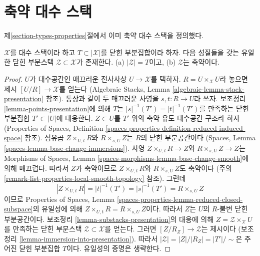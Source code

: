 \section{축약 대수 스택}
\label{section-reduced}

\noindent
제\ref{section-types-properties}절에서 이미 축약 대수 스택을 정의했다.

\begin{lemma}
\label{lemma-reduced-closed-substack}
$\mathcal{X}$를 대수 스택이라 하고 $T \subset |\mathcal{X}|$를 닫힌 부분집합이라 하자.
다음 성질들을 갖는 유일한 닫힌 부분스택
$\mathcal{Z} \subset \mathcal{X}$가 존재한다.
(a) $|\mathcal{Z}| = T$이고, (b) $\mathcal{Z}$는 축약이다.
\end{lemma}

\begin{proof}
$U$가 대수공간인 매끄러운 전사사상 $U \to \mathcal{X}$를 택하자.
$R = U \times_\mathcal{X} U$라 놓으면 제시 $[U/R] \to \mathcal{X}$를 얻는다
(Algebraic Stacks, Lemma \ref{algebraic-lemma-stack-presentation} 참조).
통상과 같이 두 매끄러운 사영을 $s, t : R \to U$라 쓰자.
보조정리 \ref{lemma-points-presentation}에 의해 $T$는
$|s|^{-1}(T') = |t|^{-1}(T')$를 만족하는 닫힌 부분집합
$T' \subset |U|$에 대응한다. $Z \subset U$를 $T'$ 위의 축약 유도
대수공간 구조라 하자(Properties of Spaces,
Definition \ref{spaces-properties-definition-reduced-induced-space} 참조).
섬유곱 $Z \times_{U, t} R$와 $R \times_{s, U} Z$는 $R$의 닫힌 부분공간이다
(Spaces, Lemma \ref{spaces-lemma-base-change-immersions}).
사영 $Z \times_{U, t} R \to Z$와 $R \times_{s, U} Z \to Z$는
Morphisms of Spaces,
Lemma \ref{spaces-morphisms-lemma-base-change-smooth}에 의해 매끄럽다.
따라서 $Z$가 축약이므로 $Z \times_{U, t} R$와
$R \times_{s, U} Z$도 축약이다
(주의 \ref{remark-list-properties-local-smooth-topology} 참조).
그런데
$$
|Z \times_{U, t} R| = |t|^{-1}(T') = |s|^{-1}(T') = R \times_{s, U} Z
$$
이므로 Properties of Spaces,
Lemma \ref{spaces-properties-lemma-reduced-closed-subspace}의 유일성에 의해
$Z \times_{U, t} R = R \times_{s, U} Z$이다.
따라서 $Z$는 $U$의 $R$-불변 닫힌 부분공간이다.
보조정리 \ref{lemma-substacks-presentation}의 대응에 의해
$Z = \mathcal{Z} \times_\mathcal{X} U$를 만족하는 닫힌 부분스택
$\mathcal{Z} \subset \mathcal{X}$를 얻는다. 그러면
$[Z/R_Z] \to \mathcal{Z}$는 제시이다
(보조정리 \ref{lemma-immersion-into-presentation}).
따라서 $|\mathcal{Z}| = |Z|/|R_Z| = |T'|/\sim$은 주어진 닫힌 부분집합
$T$이다. 유일성의 증명은 생략한다.
\end{proof}

